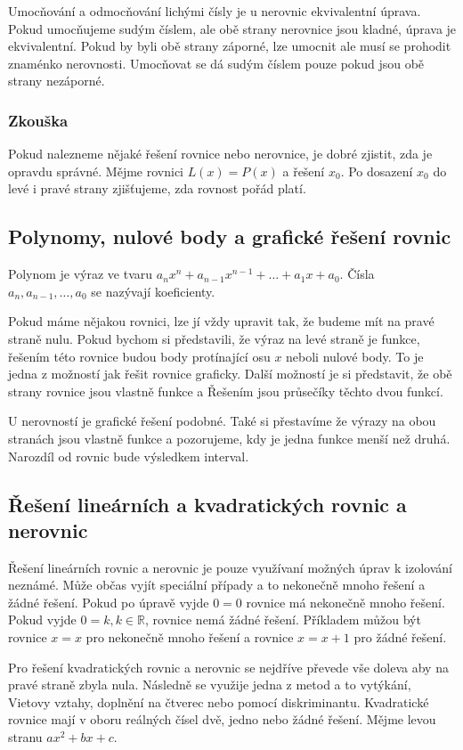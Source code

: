 \documentclass[12pt]{article}
\begin{document}
Umocňování a odmocňování lichými čísly je u nerovnic ekvivalentní úprava. Pokud umocňujeme sudým
číslem, ale obě strany nerovnice jsou kladné, úprava je ekvivalentní. Pokud by byli obě strany
záporné, lze umocnit ale musí se prohodit znaménko nerovnosti. Umocňovat se dá sudým číslem pouze
pokud jsou obě strany nezáporné.
\subsubsection*{Zkouška}
Pokud nalezneme nějaké řešení rovnice nebo nerovnice, je dobré zjistit, zda je opravdu správné.
Mějme rovnici $L(x) = P(x)$ a řešení $x_0$. Po dosazení $x_0$ do levé i pravé strany zjišťujeme, zda
rovnost pořád platí.
\subsection*{Polynomy, nulové body a grafické řešení rovnic}
Polynom je výraz ve tvaru $a_nx^n + a_{n-1}x^{n-1} + \dots + a_1x + a_0$. Čísla $a_n, a_{n-1}, \dots,
a_0$ se nazývají koeficienty.

Pokud máme nějakou rovnici, lze jí vždy upravit tak, že budeme mít na pravé straně nulu. Pokud
bychom si představili, že výraz na levé straně je funkce, řešením této rovnice budou body protínající
osu $x$ neboli nulové body. To je jedna z možností jak řešit rovnice graficky. Další možností je
si představit, že obě strany rovnice jsou vlastně funkce a Řešením jsou průsečíky těchto dvou funkcí.

U nerovností je grafické řešení podobné. Také si přestavíme že výrazy na obou stranách jsou vlastně
funkce a pozorujeme, kdy je jedna funkce menší než druhá. Narozdíl od rovnic bude výsledkem interval.
\subsection*{Řešení lineárních a kvadratických rovnic a nerovnic}
Řešení lineárních rovnic a nerovnic je pouze využívaní možných úprav k izolování neznámé.
Může občas vyjít speciální případy a to nekonečně mnoho řešení a žádné řešení. Pokud po úpravě vyjde
$0 = 0$ rovnice má nekonečně mnoho řešení. Pokud vyjde $0 = k, k \in \mathbb{R}$, rovnice nemá žádné
řešení. Příkladem můžou být rovnice $x = x$ pro nekonečně mnoho řešení a rovnice $x = x+1$ pro žádné
řešení.

Pro řešení kvadratických rovnic a nerovnic se nejdříve převede vše doleva aby na pravé straně zbyla
nula. Následně se využije jedna z metod a to vytýkání, Vietovy vztahy, doplnění na čtverec nebo pomocí
diskriminantu. Kvadratické rovnice mají v oboru reálných čísel dvě, jedno nebo žádné řešení. Mějme
levou stranu $ax^2 + bx + c$.
\end{document}
